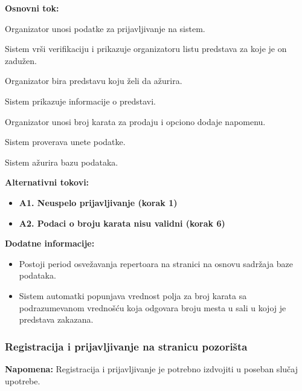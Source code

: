 \documentclass[a4paper]{article}
\begin{document}
\noindent\textbf{Osnovni tok:}
  \begin{legal}
    \item Organizator unosi podatke za prijavljivanje na sistem.
    \item Sistem vrši verifikaciju i prikazuje organizatoru listu predstava za koje je on zadužen.
    \item Organizator bira predstavu koju želi da ažurira.
    \item Sistem prikazuje informacije o predstavi.
    \item Organizator unosi broj karata za prodaju i opciono dodaje napomenu.
    \item Sistem proverava unete podatke.
    \item Sistem ažurira bazu podataka.
  \end{legal}

\noindent\textbf{Alternativni tokovi:} 
\begin{itemize}
  \item \textbf{A1. Neuspelo prijavljivanje (korak 1)} 
  \item \textbf{A2. Podaci o broju karata nisu validni (korak 6)} 
\end{itemize}

\noindent\textbf{Dodatne informacije:} 
  \begin{itemize}
    \item Postoji period osvežavanja repertoara na stranici na osnovu
          sadržaja baze podataka. 
    \item Sistem automatki popunjava vrednost polja za broj karata sa podrazumevanom
          vrednošću koja odgovara broju mesta u sali u kojoj je predstava zakazana.
  \end{itemize}

\subsubsection{Registracija i prijavljivanje na stranicu pozorišta}
  \textbf{Napomena:} Registracija i prijavljivanje je potrebno izdvojiti u poseban slučaj upotrebe.
\end{document}
